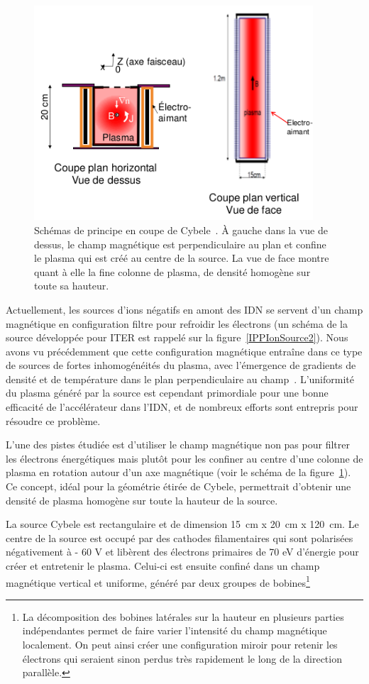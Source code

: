\begin{refsection}
\begin{figure}[!htbp]
  \centering
    \includegraphics[height=8cm]{figures/4-cybeleSchema.png}
    \caption{Schémas de principe en coupe de Cybele~\parencite{SimoninHDR}. À
    gauche dans la vue de dessus, le champ magnétique est perpendiculaire au plan et confine le
plasma qui est créé au centre de la source. La vue de face montre quant à elle
la fine colonne de plasma, de densité homogène sur toute sa hauteur.
\label{4-cybeleSchema}}
\end{figure}	

Actuellement, les sources d'ions négatifs en amont des IDN se servent d'un champ
magnétique en configuration filtre pour refroidir les électrons (un schéma de la
source développée pour ITER est rappelé sur la figure~\ref{IPPIonSource2}).
Nous avons vu précédemment que cette configuration magnétique entraîne
dans ce type de sources de fortes inhomogénéités du plasma, avec l'émergence de
gradients de densité et de température dans le plan
perpendiculaire au champ~\parencite{Fantz,Kolev}.
L'uniformité du plasma généré par la source est cependant primordiale pour une
bonne efficacité de l'accélérateur dans l'IDN, et de nombreux efforts sont
entrepris pour résoudre ce problème.

L'une des pistes étudiée est d'utiliser le champ magnétique non pas pour
filtrer les électrons énergétiques mais plutôt pour les confiner au centre
d'une colonne de plasma en rotation autour d'un axe magnétique (voir le schéma
de la figure~\ref{4-cybeleSchema}). Ce concept,
idéal pour la géométrie étirée de Cybele, permettrait d'obtenir une densité de
plasma homogène sur toute la hauteur de la source. 

La source Cybele est rectangulaire et de dimension 
15~cm x 20~cm x 120~cm. Le centre de la source est
occupé par des cathodes filamentaires qui sont polarisées négativement à - 60 V
et libèrent des électrons primaires de 70 eV
d'énergie pour créer et entretenir le plasma.
Celui-ci est ensuite confiné dans un champ magnétique vertical et uniforme, généré par deux
groupes de bobines\footnote{La décomposition des bobines
latérales sur la hauteur en plusieurs parties indépendantes permet de faire
varier l'intensité du champ magnétique localement. On peut ainsi créer une
configuration miroir pour retenir les électrons qui seraient sinon perdus très
rapidement le long de la direction parallèle. 

}
\end{refsection}
